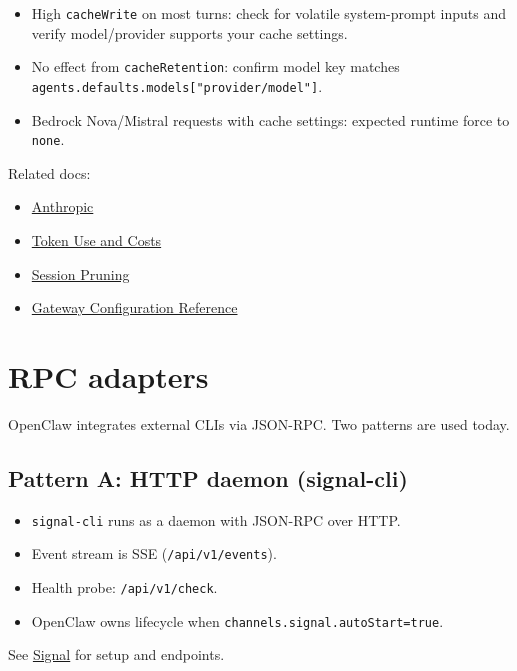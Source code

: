 \begin{itemize}
  \item High \texttt{cacheWrite} on most turns: check for volatile system-prompt inputs and verify model/provider supports your cache settings.
  \item No effect from \texttt{cacheRetention}: confirm model key matches \texttt{agents.defaults.models["provider/model"]}.
  \item Bedrock Nova/Mistral requests with cache settings: expected runtime force to \texttt{none}.
\end{itemize}


Related docs:

\begin{itemize}
  \item \href{/providers/anthropic}{Anthropic}
  \item \href{/reference/token-use}{Token Use and Costs}
  \item \href{/concepts/session-pruning}{Session Pruning}
  \item \href{/gateway/configuration-reference}{Gateway Configuration Reference}
\end{itemize}



\clearpage

\section{RPC adapters}


OpenClaw integrates external CLIs via JSON-RPC. Two patterns are used today.

\subsection{Pattern A: HTTP daemon (signal-cli)}


\begin{itemize}
  \item \texttt{signal-cli} runs as a daemon with JSON-RPC over HTTP.
  \item Event stream is SSE (\texttt{/api/v1/events}).
  \item Health probe: \texttt{/api/v1/check}.
  \item OpenClaw owns lifecycle when \texttt{channels.signal.autoStart=true}.
\end{itemize}


See \href{/channels/signal}{Signal} for setup and endpoints.

